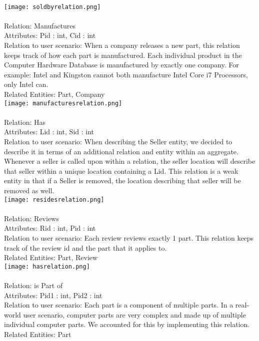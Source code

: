 {\begin{itemize}
\\
\texttt{[image: soldbyrelation.png]}
\\
\\Relation: Manufactures
\\Attributes: Pid : int, Cid : int
\\Relation to user scenario: When a company releases a new part, this relation keeps track of how each part is manufactured. Each individual product in the Computer Hardware Database is manufactured by exactly one company. For example: Intel and Kingston cannot both manufacture Intel Core i7 Processors, only Intel can.
\\Related Entities: Part, Company
\\
\texttt{[image: manufacturesrelation.png]}
\\
\\Relation: Has
\\Attributes: Lid : int, Sid : int
\\Relation to user scenario: When describing the Seller entity, we decided to describe it in terms of an additional relation and entity within an aggregate. Whenever a seller is called upon within a relation, the seller location will describe that seller within a unique location containing a Lid. This relation is a weak entity in that if a Seller is removed, the location describing that seller will be removed as well.
\\
\texttt{[image: residesrelation.png]}
\\
\\Relation: Reviews
\\Attributes: Rid : int, Pid : int
\\Relation to user scenario: Each review reviews exactly 1 part. This relation keeps track of the review id and the part that it applies to. 
\\Related Entities: Part, Review
\\
\texttt{[image: hasrelation.png]}
\\
\\Relation: is Part of
\\Attributes: Pid1 : int, Pid2 : int
\\Relation to user scenario: Each part is a component of multiple parts. In a real-world user scenario, computer parts are very complex and made up of multiple individual computer parts. We accounted for this by implementing this relation.
\\Related Entities: Part

\end{itemize}}
